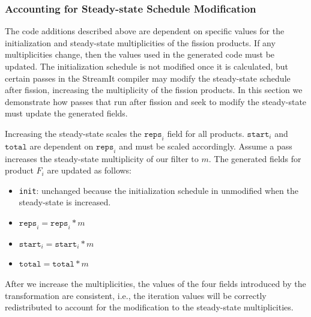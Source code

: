 \subsubsection{Accounting for Steady-state Schedule Modification}
\label{sec:ssmod}

The code additions described above are dependent on specific values
for the initialization and steady-state multiplicities of the fission
products. If any multiplicities change, then the values used in the
generated code must be updated. The initialization schedule is not
modified once it is calculated, but certain passes in the StreamIt
compiler may modify the steady-state schedule after fission,
increasing the multiplicity of the fission products.  In this section
we demonstrate how passes that run after fission and seek to
modify the steady-state must update the generated fields.

Increasing the steady-state scales the $\texttt{reps}_i$ field for all
products. $\texttt{start}_i$ and $\texttt{total}$ are dependent on
$\texttt{reps}_i$ and must be scaled accordingly. Assume a pass
increases the steady-state multiplicity of our filter to $m$. The
generated fields for product $F_i$ are updated as follows:

\begin{itemize}
    \item \texttt{init}: unchanged because the initialization schedule
      in unmodified when the steady-state is increased.
    \item $\texttt{reps}_i = \texttt{reps}_i * m $
    \item $\texttt{start}_i = \texttt{start}_i * m$
    \item $\texttt{total} = \texttt{total} * m$
\end{itemize}

After we increase the multiplicities, the values of the four fields
introduced by the transformation are consistent, i.e., the iteration
values will be correctly redistributed to account for the modification
to the steady-state multiplicities.  




